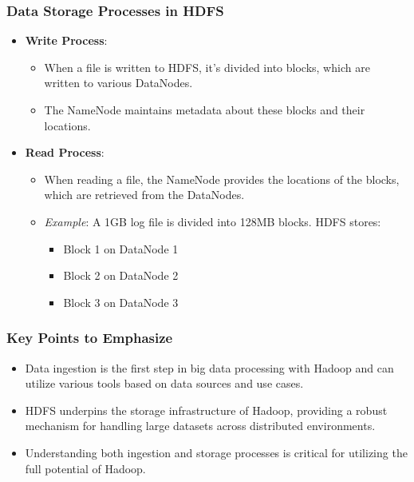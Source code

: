 \documentclass[aspectratio=169]{beamer}
\begin{document}
\begin{frame}[fragile]
    \frametitle{Data Storage Processes in HDFS}
    \begin{itemize}
        \item \textbf{Write Process}:
        \begin{itemize}
            \item When a file is written to HDFS, it’s divided into blocks, which are written to various DataNodes.
            \item The NameNode maintains metadata about these blocks and their locations.
        \end{itemize}

        \item \textbf{Read Process}:
        \begin{itemize}
            \item When reading a file, the NameNode provides the locations of the blocks, which are retrieved from the DataNodes.
            \item \textit{Example}: A 1GB log file is divided into 128MB blocks. HDFS stores:
                \begin{itemize}
                    \item Block 1 on DataNode 1
                    \item Block 2 on DataNode 2
                    \item Block 3 on DataNode 3
                \end{itemize}
        \end{itemize}
    \end{itemize}
\end{frame}

\begin{frame}[fragile]
    \frametitle{Key Points to Emphasize}
    \begin{itemize}
        \item Data ingestion is the first step in big data processing with Hadoop and can utilize various tools based on data sources and use cases.
        \item HDFS underpins the storage infrastructure of Hadoop, providing a robust mechanism for handling large datasets across distributed environments.
        \item Understanding both ingestion and storage processes is critical for utilizing the full potential of Hadoop.
    \end{itemize}
\end{frame}
\end{document}
